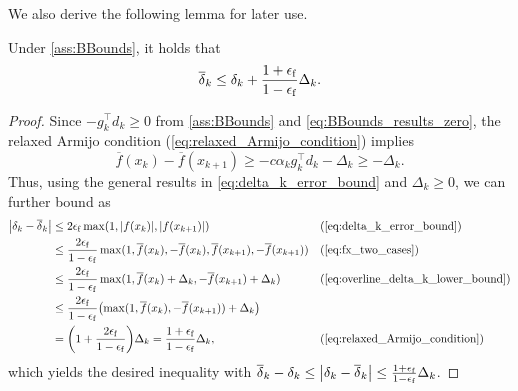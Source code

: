 \documentclass[journal]{subfiles}
\begin{document}
We also derive the following lemma for later use.
\begin{lemma}\label{lem:error_delta_bounded_by_Delta}
    Under \cref{ass:BBounds}, it holds that
    \begin{equation*}
        \overline{\delta}_k \leq \delta_k + \frac{1 + \epsilon_\mathrm{f}}{1 - \epsilon_\mathrm{f}} \Delta_k.
    \end{equation*}
\end{lemma}
\begin{proof}
    Since $-g_k^\top d_k \geq 0$ from \cref{ass:BBounds} and \cref{eq:BBounds_results_zero}, the relaxed Armijo condition (\cref{eq:relaxed_Armijo_condition}) implies
    \begin{equation}\label{eq:overline_delta_k_lower_bound}
        \overline{f}(x_k) - \overline{f}(x_{k+1})
        \geq - c \alpha_k g_k^\top d_k -\Delta_k
        \geq -\Delta_k.
    \end{equation}
    Thus, using the general results in \cref{eq:delta_k_error_bound} and $\Delta_k \geq 0$, we can further bound as
    \begin{align*}
        \abs{\delta_k - \overline{\delta}_k} & \leq 2\feps \max(1,\abs{f(x_k)},\abs{f(x_{k+1})})                                                                                 &  & (\text{\cref{eq:delta_k_error_bound}})          \\
                                             & \leq \frac{2\feps}{1-\feps} \max(1, \overline{f}(x_{k}), -\overline{f}(x_{k}), \overline{f}(x_{{k}+1}), -\overline{f}(x_{{k}+1})) &  & (\text{\cref{eq:fx_two_cases}})                 \\
                                             & \le \frac{2\feps}{1-\feps} \max(1, \overline{f}(x_{k}) + \Delta_{k}, -\overline{f}(x_{{k}+1}) + \Delta_{k})                       &  & (\text{\cref{eq:overline_delta_k_lower_bound}}) \\
                                             & \le \frac{2\feps}{1-\feps} \qty(\max(1, \overline{f}(x_{k}), -\overline{f}(x_{{k}+1})) + \Delta_k)                                                                                     \\
                                             & = \qty(1 + \frac{2\feps}{1-\feps}) \Delta_k  = \frac{1 + \feps}{1 - \feps} \Delta_k,                                              &  & (\text{\cref{eq:relaxed_Armijo_condition}})
    \end{align*}
    which yields the desired inequality with $\overline{\delta}_k - \delta_k \leq \abs{\delta_k - \overline{\delta}_k} \leq \frac{1 + \epsilon_\mathrm{f}}{1 - \epsilon_\mathrm{f}} \Delta_k$.
    \myQED
\end{proof}
\end{document}
